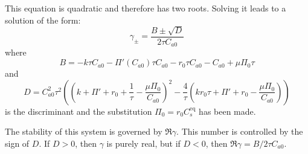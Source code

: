This equation is quadratic and therefore has two roots. Solving it leads to a solution of the form:
\begin{equation}
  \label{eq:eigenvalues_of_one_box_jac}
  \gamma_{\pm} = \frac{B \pm \sqrt{D}}{2\tau C_{a0}}
\end{equation}
where
\begin{equation}
  \label{eq:B_in_one_box}
  B = -k \tau  C_{a0}-\Pi'(C_{a0}) \tau  C_{a0}-r_0 \tau  C_{a0}-C_{a0}+\mu  \Pi_0 \tau
\end{equation}
and
\begin{equation}
  \label{eq:discriminant_from_one_box}
  D = C_{a0}^2\tau^2\left(\left(k +\Pi' +r_0  +\frac{1}{\tau}-\frac{\mu  \Pi_0}{C_{a0}} \right)^2-\frac{4}{\tau}\left(k r_0 \tau +\Pi'+r_0-\frac{\mu  \Pi_0}{C_{a0}}\right)\right)
\end{equation}
is the discriminant and the substitution $\Pi_0 = r_0 C_s^{\mathrm{eq}}$ has been made.

The stability of this system is governed by $\Re \gamma$. This number is controlled by the sign of $D$. If $D > 0$, then $\gamma$ is purely real, but if $D < 0$, then
$\Re \gamma = B / 2\tau C_{a0}$. 

